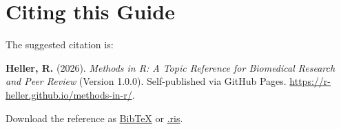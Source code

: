\documentclass[
]{article}
\author{}
\date{\vspace{-2.5em}}
\begin{document}
\section*{Citing this Guide}\label{citing-this-guide}

The suggested citation is:

\begin{boxempty}
\textbf{Heller, R.} (2026). \emph{Methods in R: A Topic Reference for
Biomedical Research and Peer Review} (Version 1.0.0). Self-published via
GitHub Pages. \url{https://r-heller.github.io/methods-in-r/}.
\end{boxempty}

Download the reference as \href{citation-files/citation.bib}{BibTeX} or
\href{citation-files/citation.ris}{.ris}.
\end{document}
